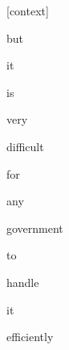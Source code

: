 \documentclass[varwidth]{standalone}
\begin{document}
\begin{CJK*}{UTF8}{gbsn}
{\setlength{\fboxsep}{0pt}\colorbox{white!0}{\parbox{0.9\textwidth}{
\colorbox{red!1.181601068074925e-13}{\strut [context]} \colorbox{red!1.1306106273423211e-08}{\strut but} \colorbox{red!2.080654724068154e-07}{\strut it} \colorbox{red!1.2445947383810108e-08}{\strut is} \colorbox{red!2.7466347091831267e-05}{\strut very} \colorbox{red!0.09963034093379974}{\strut difficult} \colorbox{red!24.634044647216797}{\strut for} \colorbox{red!0.5336697101593018}{\strut any} \colorbox{red!0.3710311949253082}{\strut government} \colorbox{red!0.012192530557513237}{\strut to} \colorbox{red!2.203514575958252}{\strut handle} \colorbox{red!1.5022822618484497}{\strut it} \colorbox{red!70.64361572265625}{\strut efficiently} 
}}}
\end{CJK*}
\end{document}
